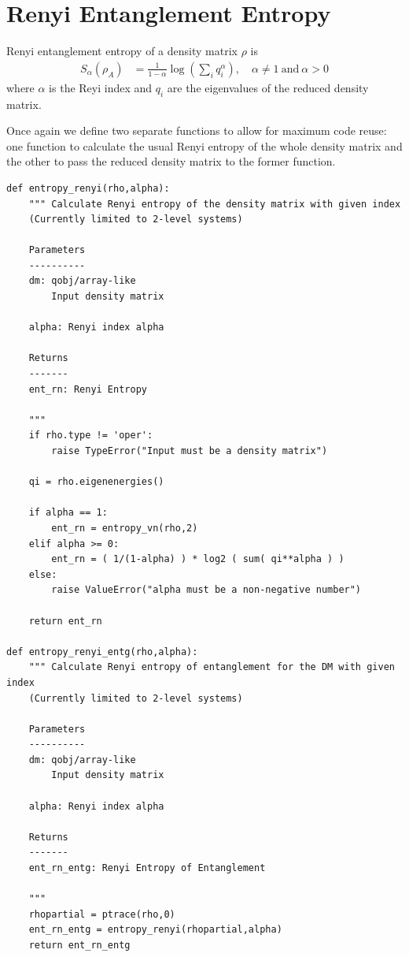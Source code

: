 \section{Renyi Entanglement Entropy}
Renyi entanglement entropy of a density matrix $\rho$ is
\begin{align*}
S_\alpha (\rho_A) &= \frac{1}{1-\alpha} \log \left( \sum_i q_i^\alpha \right) , \quad \alpha \neq 1 \: \text{and} \: \alpha > 0
\end{align*}
where $\alpha$ is the Reyi index and $q_i$ are the eigenvalues of the reduced density matrix.
\par Once again we define two separate functions to allow for maximum code reuse: one function to calculate the usual Renyi entropy of the whole density matrix and the other to pass the reduced density matrix to the former function.
\begin{verbatim}
def entropy_renyi(rho,alpha):
    """ Calculate Renyi entropy of the density matrix with given index
    (Currently limited to 2-level systems)
    
    Parameters
    ----------
    dm: qobj/array-like
        Input density matrix
        
    alpha: Renyi index alpha
    
    Returns
    -------
    ent_rn: Renyi Entropy
    
    """
    if rho.type != 'oper':
        raise TypeError("Input must be a density matrix")
    
    qi = rho.eigenenergies()
    
    if alpha == 1:
        ent_rn = entropy_vn(rho,2)
    elif alpha >= 0:
        ent_rn = ( 1/(1-alpha) ) * log2 ( sum( qi**alpha ) )
    else:
        raise ValueError("alpha must be a non-negative number")
    
    return ent_rn

def entropy_renyi_entg(rho,alpha):
    """ Calculate Renyi entropy of entanglement for the DM with given index
    (Currently limited to 2-level systems)
    
    Parameters
    ----------
    dm: qobj/array-like
        Input density matrix
        
    alpha: Renyi index alpha
    
    Returns
    -------
    ent_rn_entg: Renyi Entropy of Entanglement
    
    """
    rhopartial = ptrace(rho,0)
    ent_rn_entg = entropy_renyi(rhopartial,alpha)
    return ent_rn_entg

\end{verbatim}

